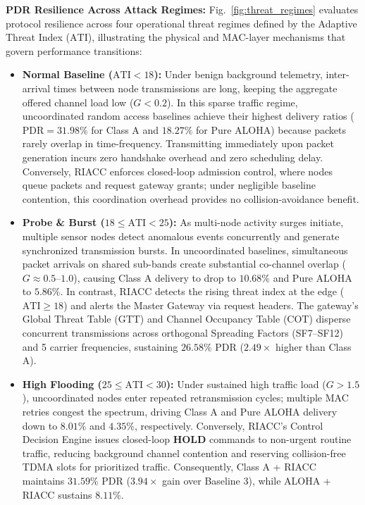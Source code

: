 \documentclass[preprint,review,12pt]{elsarticle}
\begin{document}
\textbf{PDR Resilience Across Attack Regimes:} Fig.~\ref{fig:threat_regimes} evaluates protocol resilience across four operational threat regimes defined by the Adaptive Threat Index ($\text{ATI}$), illustrating the physical and MAC-layer mechanisms that govern performance transitions:
\begin{itemize}
    \item \textbf{Normal Baseline ($\text{ATI} < 18$):} Under benign background telemetry, inter-arrival times between node transmissions are long, keeping the aggregate offered channel load low ($G < 0.2$). In this sparse traffic regime, uncoordinated random access baselines achieve their highest delivery ratios ($\text{PDR} = 31.98\%$ for Class A and $18.27\%$ for Pure ALOHA) because packets rarely overlap in time-frequency. Transmitting immediately upon packet generation incurs zero handshake overhead and zero scheduling delay. Conversely, RIACC enforces closed-loop admission control, where nodes queue packets and request gateway grants; under negligible baseline contention, this coordination overhead provides no collision-avoidance benefit.
    \item \textbf{Probe \& Burst ($18 \le \text{ATI} < 25$):} As multi-node activity surges initiate, multiple sensor nodes detect anomalous events concurrently and generate synchronized transmission bursts. In uncoordinated baselines, simultaneous packet arrivals on shared sub-bands create substantial co-channel overlap ($G \approx 0.5\text{--}1.0$), causing Class A delivery to drop to $10.68\%$ and Pure ALOHA to $5.86\%$. In contrast, RIACC detects the rising threat index at the edge ($\text{ATI} \ge 18$) and alerts the Master Gateway via request headers. The gateway's Global Threat Table (GTT) and Channel Occupancy Table (COT) disperse concurrent transmissions across orthogonal Spreading Factors (SF7--SF12) and 5 carrier frequencies, sustaining $\mathbf{26.58\%}$ PDR ($2.49\times$ higher than Class A).
    \item \textbf{High Flooding ($25 \le \text{ATI} < 30$):} Under sustained high traffic load ($G > 1.5$), uncoordinated nodes enter repeated retransmission cycles; multiple MAC retries congest the spectrum, driving Class A and Pure ALOHA delivery down to $8.01\%$ and $4.35\%$, respectively. Conversely, RIACC's Control Decision Engine issues closed-loop $\textbf{HOLD}$ commands to non-urgent routine traffic, reducing background channel contention and reserving collision-free TDMA slots for prioritized traffic. Consequently, Class A + RIACC maintains $\mathbf{31.59\%}$ PDR ($3.94\times$ gain over Baseline 3), while ALOHA + RIACC sustains $8.11\%$.

\end{itemize}
\end{document}
